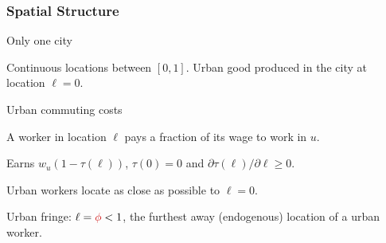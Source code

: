 \documentclass[aspectratio=169]{beamer}
\begin{document}
\begin{v75mins}
\begin{frame}
\frametitle{Spatial Structure}
\begin{midi}
\item Only one city 
\item Continuous locations \re{$\ell$} between $[0,1]$. Urban good produced in the city at location $\ell=0$.

\item Urban commuting costs
 \bi \item A worker in location $\ell$ pays a fraction \re{$\tau(\ell)$} of its wage to work in $u$.
 \item Earns $w_u(1-\tau(\ell))$, $\tau(0)=0$ and $\partial \tau(\ell)/\partial \ell \geq 0$. \ei
\item Urban workers locate as close as possible to $\ell=0$.
\item Urban fringe: $\ell=\re{\phi}<1$, the furthest away (endogenous) location of a urban worker.
\end{midi}

\end{frame}\end{v75mins}

\end{document}
